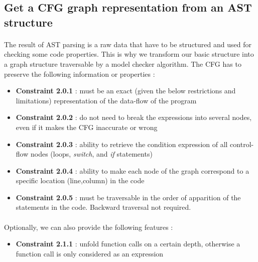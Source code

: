 \documentclass{report}
\begin{document}
\subsection{Get a CFG graph representation from an AST structure}

\paragraph{}
\hspace{4mm}The result of AST parsing is a raw data that have to be structured and used for checking some code properties. 
This is why we transform our basic structure into a graph structure traversable by a model checker algorithm. The CFG has to preserve the following information or
properties :

\vspace{1.5mm}
\begin{itemize}
\item \textbf{Constraint 2.0.1} : must be an exact (given the below restrictions and limitations) representation of the data-flow of the program\vspace{1mm}
\item \textbf{Constraint 2.0.2} : do not need to break the expressions into several nodes, even if it makes the CFG inaccurate or wrong\vspace{1mm}
\item \textbf{Constraint 2.0.3} : ability to retrieve the condition expression of all control-flow nodes (loops, \textit{switch}, and \textit{if} statements)\vspace{1mm}
\item \textbf{Constraint 2.0.4} : ability to make each node of the graph correspond to a specific location (line,column) in the code\vspace{1mm}
\item \textbf{Constraint 2.0.5} : must be traversable in the order of apparition of the statements in the code. Backward traversal not required.\vspace{1mm}
\end{itemize}

\paragraph{}
\hspace{4mm}Optionally, we can also provide the following features  :

\vspace{1.5mm}
\begin{itemize}
\item \textbf{Constraint 2.1.1} : unfold function calls on a certain depth, otherwise a function call is only considered as an expression\vspace{1mm}
\end{itemize}
\end{document}
